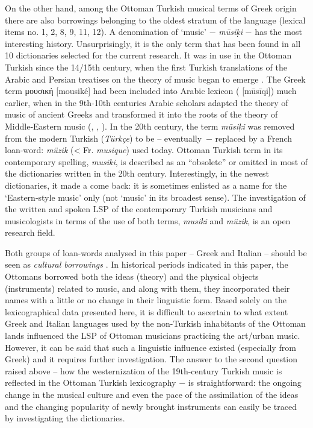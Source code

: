 \documentclass[output=paper,colorlinks,citecolor=brown,arabicfont,chinesefont]{langscibook}
\begin{document}
On the other hand, among the Ottoman Turkish musical terms of Greek origin there are also borrowings belonging to the oldest stratum of the language (lexical items no. 1, 2, 8, 9, 11, 12). A denomination of ‘music’ − \emph{mūsiḳi} − has the most interesting history. Unsurprisingly, it is the only term that has been found in all 10 dictionaries selected for the current research. It was in use in the Ottoman Turkish since the 14/15th century, when the first Turkish translations of the Arabic and Persian treatises on the theory of music began to emerge \citep{Kalender1981}. The Greek term μουσική [mousiké] had been included into Arabic lexicon ({} [mūsīqi]) much earlier, when in the 9th-10th centuries Arabic scholars adapted the theory of music of ancient Greeks and transformed it into the roots of the theory of Middle-Eastern music (\citealt{Danielson2002}, \citealt[215,290,341]{Oztuna1969}, \citealt[52--53]{ReinhardReinhard1984}). In the 20th century, the term \emph{mūsiḳi} was removed from the modern Turkish (\emph{Türkçe}) to be – eventually~− replaced by a French loan\hyp word: \emph{müzik} (< Fr. \emph{musique}) used today. Ottoman Turkish term in its contemporary spelling, \emph{musiki}, is described as an “obsolete” or omitted in most of the dictionaries written in the 20th century. Interestingly, in the newest dictionaries, it made a come back: it is sometimes enlisted as a name for the ‘Eastern-style music’ only (not ‘music’ in its broadest sense). The investigation of the written and spoken LSP of the contemporary Turkish musicians and musicologists in terms of the use of both terms, \emph{musiki} and \emph{müzik}, is an open research field.

Both groups of loan-words analysed in this paper – Greek and Italian – should be seen as \emph{cultural borrowings} \citep{Bloomfield1984}. In historical periods indicated in this paper, the Ottomans borrowed both the ideas (theory) and the physical objects (instruments) related to music, and along with them, they incorporated their names with a little or no change in their linguistic form. Based solely on the lexicographical data presented here, it is difficult to ascertain to what extent Greek and Italian languages used by the non-Turkish inhabitants of the Ottoman lands influenced the LSP of Ottoman musicians practicing the art/urban music. However, it can be said that such a linguistic influence existed (especially from Greek) and it requires further investigation. The answer to the second question raised above – how the westernization of the 19th-century Turkish music is reflected in the Ottoman Turkish lexicography − is straightforward: the ongoing change in the musical culture and even the pace of the assimilation of the ideas and the changing popularity of newly brought instruments can easily be traced by investigating the dictionaries.
\end{document}
